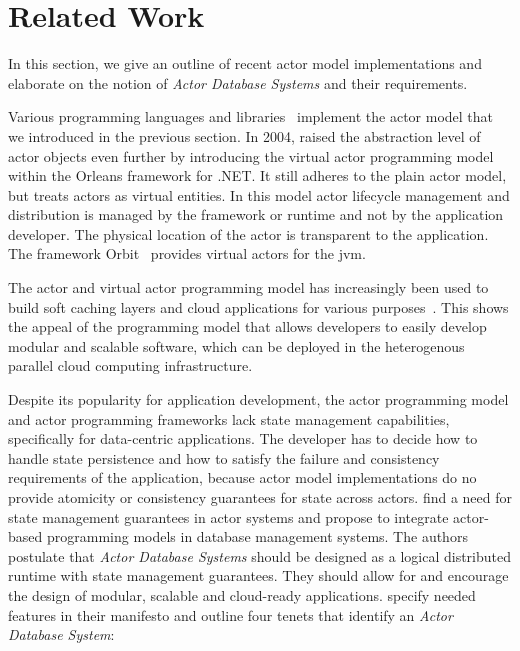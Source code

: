 
\section{Related Work}\label{sec:related_work}
  In this section, we give an outline of recent actor model implementations and elaborate on the notion of \textit{Actor Database Systems} and their requirements.

  Various programming languages and libraries~\cite{armstrong:erlang,Haller:2012,akka,akka.net} implement the actor model that we introduced in the previous section.
  In 2004, \citet{bernstein:orleans} raised the abstraction level of actor objects even further by introducing the virtual actor programming model within the Orleans framework for .NET.
  It still adheres to the plain actor model, but treats actors as virtual entities.
  In this model actor lifecycle management and distribution is managed by the framework or runtime and not by the application developer.
  The physical location of the actor is transparent to the application.
  The framework Orbit~\cite{orbit} provides virtual actors for the \gls{jvm}.

  The actor and virtual actor programming model has increasingly been used to build soft caching layers and cloud applications for various purposes~\cite{erlang_uses,akka_uses,orleans_uses}.
  This shows the appeal of the programming model that allows developers to easily develop modular and scalable software, which can be deployed in the heterogenous parallel cloud computing infrastructure.

  Despite its popularity for application development, the actor programming model and actor programming frameworks lack state management capabilities, specifically for data-centric applications.
  The developer has to decide how to handle state persistence and how to satisfy the failure and consistency requirements of the application, because actor model implementations do no provide atomicity or consistency guarantees for state across actors.
   find a need for state management guarantees in actor systems and propose to integrate actor-based programming models in database management systems.
  The authors postulate that \textit{Actor Database Systems} should be designed as a logical distributed runtime with state management guarantees.
  They should allow for and encourage the design of modular, scalable and cloud-ready applications.
   specify needed features in their manifesto and outline four tenets that identify an \textit{Actor Database System}:

